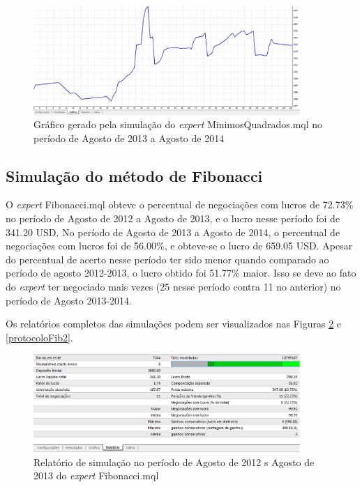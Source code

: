 \begin{figure}[H]
\centering
\includegraphics[width=0.9\textwidth]{figuras/protocoloMinimos4}
\caption{Gráfico gerado pela simulação do \textit{expert} MinimosQuadrados.mql no período de Agosto de 2013 a Agosto de 2014}
\label{protocoloMinimos4}
\end{figure}

\subsection{Simulação do método de Fibonacci}

O \textit{expert} Fibonacci.mql obteve o percentual de negociações com lucros de 72.73\% no período de Agosto de 2012 a Agosto de 2013, e o  lucro nesse período foi de 341.20 USD.
No período de Agosto de 2013 a Agosto de 2014, o percentual de negociações com lucros foi de 56.00\%,  e obteve-se o lucro de 659.05 USD. Apesar do percentual de acerto nesse período ter sido menor quando comparado ao período de agosto 2012-2013, o lucro obtido foi 51.77\% maior. Isso se deve ao fato do \textit{expert} ter negociado mais vezes (25 nesse período contra 11 no anterior) no período de Agosto 2013-2014.

Os relatórios completos das simulações podem ser visualizados nas Figuras \ref{protocoloFib} e \ref{protocoloFib2}.

\begin{figure}[H]
\centering
\includegraphics[width=0.9\textwidth]{figuras/protocoloFib}
\caption{Relatório de simulação no período de Agosto de 2012 s Agosto de 2013 do \textit{expert} Fibonacci.mql}
\label{protocoloFib}
\end{figure}

